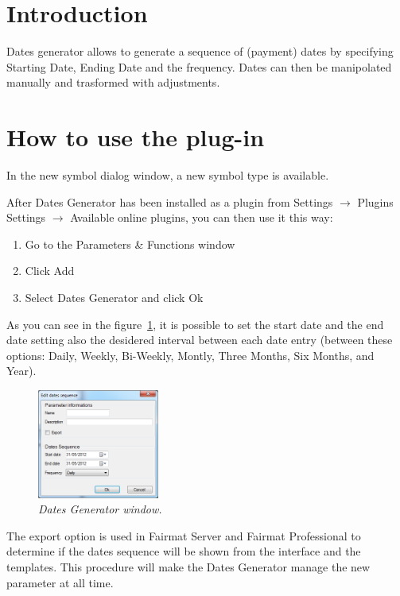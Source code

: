 \newcommand{\pluginName}{Dates Generator}
\newcommand{\pluginVersion}{1.0}





\PluginTitle{\pluginName}{\pluginVersion}

\section{Introduction}
Dates generator allows to generate a sequence of (payment) dates by specifying Starting Date, Ending Date and the frequency.  Dates can then be manipolated manually and trasformed with adjustments.
\section{How to use the plug-in}
In the new symbol dialog window, a new symbol type is available.

After Dates Generator has been installed as a plugin from Settings $\to$ Plugins Settings 
$\to$ Available online plugins, you can then use it this way: 
\begin{enumerate}
\item Go to the Parameters \& Functions window
\item Click Add
\item Select Dates Generator and click Ok
\end{enumerate}
As you can see in the figure~\ref{fig:DG}, it is possible to set the start date and the end date setting also the desidered interval between each date entry (between these options: Daily, Weekly, Bi-Weekly, Montly, Three Months, Six Months, and Year).
\begin{figure}[h!]
\includegraphics[width=4cm]{DG_img}
\centering
\caption{\small{\emph{Dates Generator window.}}}
\label{fig:DG}
\end{figure}
The export option is used in Fairmat Server and Fairmat Professional to determine if the dates sequence will be shown from the interface and the templates. This procedure will make the Dates Generator manage the new parameter at all time. 

